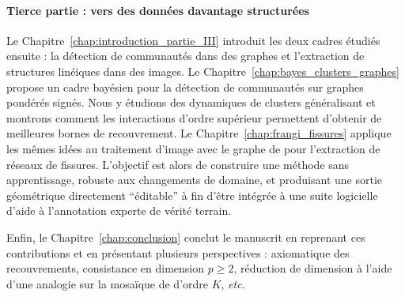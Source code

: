 \paragraph{Tierce partie : vers des données davantage structurées}
Le Chapitre~\ref{chap:introduction_partie_III} introduit les deux cadres étudiés ensuite : la détection de communautés dans des graphes et l'extraction de structures linéiques dans des
images. 
Le Chapitre~\ref{chap:bayes_clusters_graphes} propose un cadre bayésien pour la détection de communautés sur graphes pondérés signés. 
Nous y étudions des dynamiques de clusters généralisant  et montrons comment les interactions d'ordre supérieur permettent d'obtenir de meilleures bornes de recouvrement. 
Le Chapitre~\ref{chap:frangi_fissures} applique les mêmes idées au traitement d'image avec le graphe de  pour l'extraction de réseaux de fissures.
L'objectif est alors de construire une méthode sans apprentissage, robuste aux changements de domaine, et produisant une sortie géométrique directement ``éditable'' à fin d'être intégrée à une suite logicielle d'aide à l'annotation experte de vérité terrain.

Enfin, le Chapitre~\ref{chap:conclusion} conclut le manuscrit en reprenant ces contributions et en présentant plusieurs perspectives : axiomatique des recouvrements, consistance en dimension $p\geq2$, réduction de dimension à l'aide d'une analogie sur la mosaïque de  d'ordre $K$, \emph{etc}.


